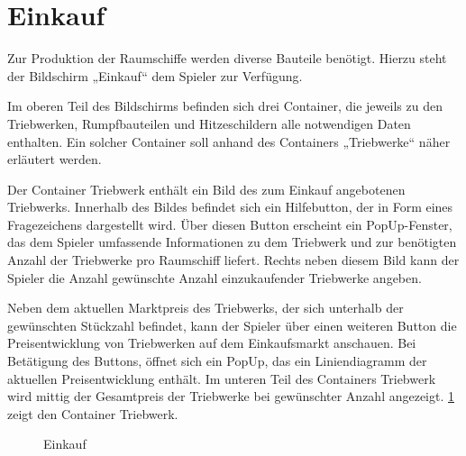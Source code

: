\section{Einkauf}
\label{sec:ui-einkauf}

Zur Produktion der Raumschiffe werden diverse Bauteile benötigt. Hierzu steht der Bildschirm „Einkauf“ dem Spieler zur Verfügung.
 
Im oberen Teil des Bildschirms befinden sich drei Container, die jeweils zu den Triebwerken, Rumpfbauteilen und Hitzeschildern alle notwendigen Daten enthalten. Ein solcher Container soll anhand des Containers „Triebwerke“ näher erläutert werden. 
 
Der Container Triebwerk enthält ein Bild des zum Einkauf angebotenen Triebwerks. Innerhalb des Bildes befindet sich ein Hilfebutton, der in Form eines Fragezeichens dargestellt wird. Über diesen Button erscheint ein PopUp-Fenster, das dem Spieler umfassende Informationen zu dem Triebwerk und zur benötigten Anzahl der Triebwerke pro Raumschiff liefert. Rechts neben diesem Bild kann der Spieler die Anzahl gewünschte Anzahl einzukaufender Triebwerke angeben.
 
Neben dem aktuellen Marktpreis des  Triebwerks, der sich unterhalb der gewünschten Stückzahl befindet, kann der Spieler über einen weiteren Button die Preisentwicklung von Triebwerken auf dem Einkaufsmarkt anschauen. Bei Betätigung des Buttons, öffnet sich ein PopUp, das ein Liniendiagramm der aktuellen Preisentwicklung enthält. Im unteren Teil des Containers Triebwerk wird mittig der Gesamtpreis der Triebwerke bei gewünschter Anzahl angezeigt. \ref{img:ui-triebwerk}  zeigt den Container Triebwerk.

\begin{figure}[htb]
  \centering
  \caption{Einkauf}
  \label{img:ui-triebwerk}
\end{figure}
 
